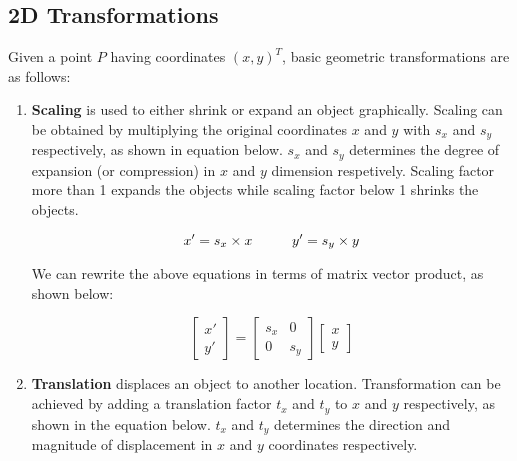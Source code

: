 \documentclass{book}
\begin{document}
            \subsection{2D Transformations} 
                Given a point $P$ having coordinates $(x,y)^{T}$, basic geometric transformations are as follows:
                \begin{enumerate}
                    \item \textbf{Scaling} is used to either shrink or expand an object graphically. Scaling can be obtained by multiplying
                    the original coordinates $x$ and $y$ with $s_{x}$ and $s_{y}$ respectively, as shown in equation below.
                    $s_{x}$ and $s_{y}$ determines the degree of expansion (or compression) in $x$ and $y$ dimension respetively. Scaling
                    factor more than 1 expands the objects while scaling factor below 1 shrinks the objects.
                    
                    \begin{equation} \label{eq_scaleNaive}
                        x' = s_{x} \times x \hspace{10mm} y' = s_{y} \times y
                    \end{equation} 

                    We can rewrite the above equations in terms of matrix vector product, as shown below: 

                    \begin{equation}
                        \begin{bmatrix}
                            x'\\ 
                            y'
                            \end{bmatrix} = \begin{bmatrix}
                            s_{x} & 0\\ 
                            0 & s_{y}
                            \end{bmatrix}
                            \begin{bmatrix}
                            x\\ 
                            y
                            \end{bmatrix}
                    \end{equation}

                    \item \textbf{Translation} displaces an object to another location. Transformation can be achieved by adding a translation 
                    factor $t_{x}$ and $t_{y}$ to $x$ and $y$ respectively, as shown in the equation below. $t_{x}$ and $t_{y}$ determines the 
                    direction and magnitude of displacement in $x$ and $y$ coordinates respectively. 


\end{enumerate}
\end{document}
